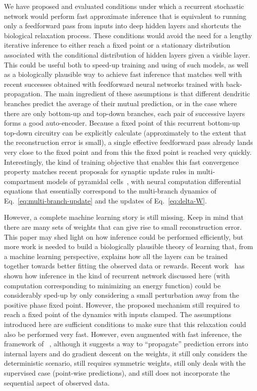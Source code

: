 \documentclass{article}
\begin{document}
We have proposed and evaluated
conditions under which a recurrent stochastic network would perform fast approximate inference
that is equivalent to running only a feedforward pass from inputs into deep hidden layers and shortcuts
the biological relaxation process. These conditions
would avoid the need for a lengthy iterative inference to either reach a fixed point or a stationary distribution
associated with the conditional distribution of hidden layers given a visible layer. This could be useful
both to speed-up training and using of such models, as well as a biologically plausible way to achieve
fast inference that matches well with recent successes obtained with feedforward neural networks trained
with back-propagation. The main ingredient of these assumptions is that different dendritic branches
predict the average of their mutual prediction, or in the case where there are only bottom-up
and top-down branches, each pair of successive layers
forms a good auto-encoder. Because a fixed point of this recurrent bottom-up top-down circuitry
can be explicitly calculate (approximately to the extent that the reconstruction error is small),
a single effective feedforward pass already lands very close to the fixed point and from this
the fixed point is reached very quickly.
Interestingly, the kind of training objective that enables this fast convergence property
matches recent proposals for synaptic update rules
in multi-compartment models of pyramidal cells~\citep{Urbanczik+Senn-2014}, with neural computation
differential equations that essentially correspond to the multi-branch dynamics
of Eq.~\ref{eq:multi-branch-update} and the updates of Eq.~\ref{eq:delta-W}.

However, a complete machine learning story is still missing. Keep in mind that there are many
sets of weights that can give rise to small reconstruction error.  This paper may shed light
on how inference could be performed efficiently, but more work is needed to build a biologically plausible
theory of learning that, from a machine learning perspective, explains how all the layers can be
trained together towards better fitting the observed data or rewards.
Recent work~\citep{Scellier+Bengio-arxiv2016} has shown how
inference in the kind of recurrent network discussed here (with computation
corresponding to minimizing an energy function) could be considerably
sped-up by only considering a small perturbation away from the positive
phase fixed point. However, the proposed mechanism still required to reach
a fixed point of the dynamics with inputs clamped. The assumptions introduced here
are sufficient conditions to make sure that this relaxation
could also be performed very fast. However, even augmented with fast inference, the
framework of ~\citet{Scellier+Bengio-arxiv2016}, although it suggests a way to ``propagate''
prediction errors into internal layers and do gradient descent on the weights, it
still only considers the deterministic scenario, still requires symmetric weights,
still only deals with the supervised case (point-wise predictions), and still does
not incorporate the sequential aspect of observed data.
\end{document}
